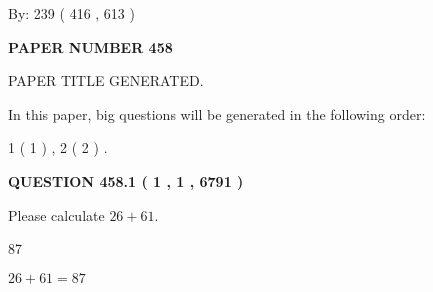 \documentclass[12pt]{article}
\begin{document}
   
\hspace{1.0in} By: 
 239 ( 416 ,  613 )
   
   
   
   
\newpage 
\setcounter{page}{ 
   458001 } 
   
   
   
   
 {\textbf{ \Large{ PAPER NUMBER  458  }}}
   
   
\vspace{0.2in}
   
   
   
   
   
   
   
   
 \vspace{0.2in}
 
 
 
 
   
   
 PAPER TITLE GENERATED.
   
   
   
\vspace{0.2in}
   
In this paper, big questions will be generated in the following order: 
   
   
   1 ( 1 )
 ,
   2 ( 2 )
 .
  
\vspace{0.2in}
  
{\textbf{\Large{QUESTION
458.1 
 ( 1 , 1 , 6791 )
}}}
  
  
 
Please calculate $ %
26 +  %
61 $.
 
 
 
\noindent{}
 
 

87
 
 
\noindent{}
 
 

 
 
 
\noindent{}
 
 

$ %
26 +  %
61=   %
87$
 
 
\noindent{}
 
\end{document}
